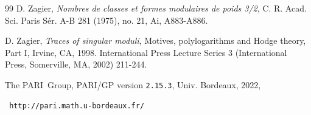 \documentclass[11pt,letterpaper]{amsart}
\theoremstyle{remark}
\begin{document}
\begin{thebibliography}{99}
  D. Zagier, {\it Nombres de classes et formes modulaires de poids 3/2}, C. R. Acad. Sci. Paris Sér. A-B 281 (1975), no. 21, Ai, A883-A886.

  D. Zagier, {\it Traces of singular moduli}, Motives, polylogarithms and Hodge theory, Part I, Irvine, CA,
1998. International Press Lecture Series 3 (International Press, Somerville, MA, 2002) 211-244.

    The PARI~Group, PARI/GP version \texttt{2.15.3}, Univ. Bordeaux, 2022,  \begin{verbatim} http://pari.math.u-bordeaux.fr/ \end{verbatim}
    
\end{thebibliography}
\end{document}

